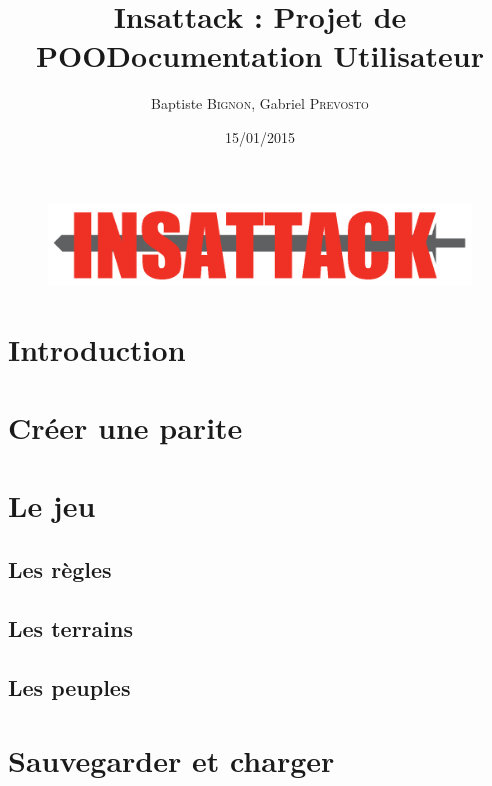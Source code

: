 \documentclass[12pt]{article}
\title{Insattack : Projet de POO\smallbreak Documentation Utilisateur}
\author{Baptiste \textsc{Bignon}, Gabriel \textsc{Prevosto}}
\date{15/01/2015}
\begin{document}
\maketitle
\vfill %

\begin{figure}[!h]
\centering
\includegraphics[width=\textwidth]{Parties/Images/Logo}
\label{fig:logo}
\end{figure}

\vfill
\vfill
\newpage

\tableofcontents
\renewcommand{\contentsname}{Sommaire}
\newpage


\section{Introduction}				\label{sec:introduction}			
\newpage

\section{Créer une parite}			\label{sec:creation_partie}			
\clearpage

\section{Le jeu}					\label{sec:jeu}
\subsection{Les règles}				\label{sec:regles}					
\clearpage
\subsection{Les terrains}			\label{sec:terrains}				
\clearpage
\subsection{Les peuples}			\label{sec:departements}			
\clearpage

\section{Sauvegarder et charger}	\label{sec:sauvegarde_chargement}	
\clearpage

\end{document}
